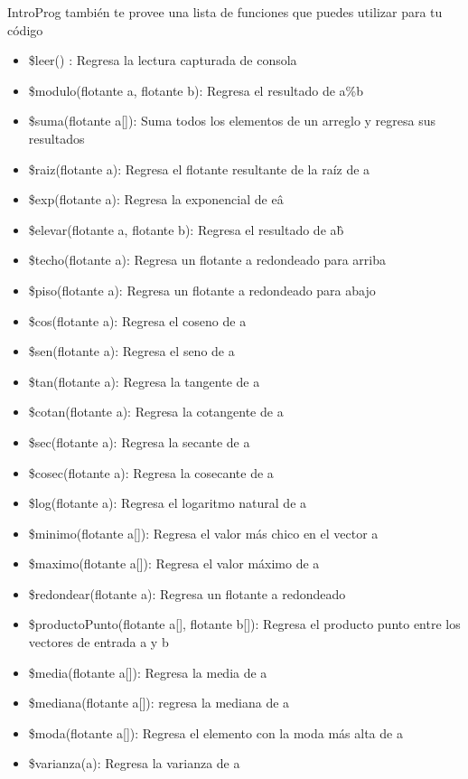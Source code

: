\documentclass[
10pt, %
a4paper, %
oneside, %
headinclude,footinclude, %
BCOR5mm, %
]{scrartcl}
\begin{document}
IntroProg también te provee una lista de funciones que puedes utilizar para tu código
\begin{itemize}
    \item  \$leer() : Regresa la lectura capturada de consola
    \item  \$modulo(flotante a, flotante b): Regresa el resultado de a\%b
    \item  \$suma(flotante a[]): Suma todos los elementos de un arreglo y regresa sus resultados
    \item  \$raiz(flotante a): Regresa el flotante resultante de la raíz de a
    \item  \$exp(flotante a): Regresa la exponencial de e\^a
    \item  \$elevar(flotante a, flotante b): Regresa el resultado de a\^b
    \item  \$techo(flotante a): Regresa un flotante a redondeado para arriba
    \item  \$piso(flotante a): Regresa un flotante a redondeado para abajo
    \item  \$cos(flotante a): Regresa el coseno de a
    \item  \$sen(flotante a): Regresa el seno de a
    \item  \$tan(flotante a): Regresa la tangente de a
    \item  \$cotan(flotante a): Regresa la cotangente de a
    \item  \$sec(flotante a): Regresa la secante de a
    \item  \$cosec(flotante a): Regresa la cosecante de a
    \item  \$log(flotante a): Regresa el logaritmo natural de a
    \item  \$minimo(flotante a[]): Regresa el valor más chico en el vector a
    \item  \$maximo(flotante a[]): Regresa el valor máximo de a
    \item  \$redondear(flotante a): Regresa un flotante a redondeado
    \item  \$productoPunto(flotante a[], flotante b[]): Regresa el producto punto entre los vectores de entrada a y b
    \item  \$media(flotante a[]): Regresa la media de a
    \item  \$mediana(flotante a[]): regresa la mediana de a
    \item  \$moda(flotante a[]): Regresa el elemento con la moda más alta de a
    \item  \$varianza(a): Regresa la varianza de a

\end{itemize}
\end{document}
